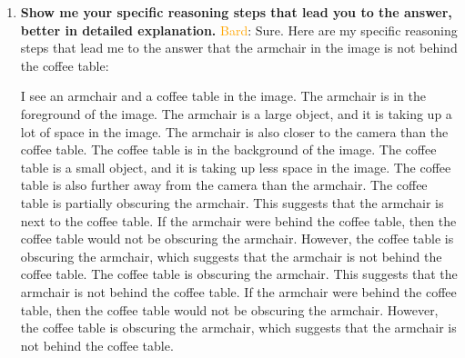 \begin{enumerate}
    The armchair is in the foreground of the image. The armchair is a large object, and it is taking up a lot of space in the image. The armchair is also closer to the camera than the coffee table.
    The coffee table is in the background of the image. The coffee table is a small object, and it is taking up less space in the image. The coffee table is also further away from the camera than the armchair.
    The coffee table is partially obscuring the armchair. This suggests that the armchair is next to the coffee table.
    If the armchair were behind the coffee table, then the coffee table would not be obscuring the armchair. However, the coffee table is obscuring the armchair, which suggests that the armchair is not behind the coffee table.
    
    Therefore, the armchair in the image is not behind the coffee table. The armchair is next to the coffee table.
    \subitem \textcolor{orange}{Visual ChatGPT}: The armchair is not behind the coffee table, it is located to the left of the coffee table.
    \subitem \textcolor{orange}{MiniGPT-4}: No, the armchair is in front of the coffee table. The armchair is positioned near the coffee table, and they are facing each other. The armchair is on the right side of the coffee table, and the coffee table is on the left side of the armchair. There is a rug on the floor in front of the armchair and coffee table. The room has a neutral color scheme, with beige walls and light wood furniture. The lighting in the room is bright and evenly distributed.
    \item \textbf{Show me your specific reasoning steps that lead you to the answer, better in detailed explanation.}
    \subitem \textcolor{orange}{Bard}: 
    Sure. Here are my specific reasoning steps that lead me to the answer that the armchair in the image is not behind the coffee table:
    
    I see an armchair and a coffee table in the image.
    The armchair is in the foreground of the image. The armchair is a large object, and it is taking up a lot of space in the image. The armchair is also closer to the camera than the coffee table.
    The coffee table is in the background of the image. The coffee table is a small object, and it is taking up less space in the image. The coffee table is also further away from the camera than the armchair.
    The coffee table is partially obscuring the armchair. This suggests that the armchair is next to the coffee table.
    If the armchair were behind the coffee table, then the coffee table would not be obscuring the armchair. However, the coffee table is obscuring the armchair, which suggests that the armchair is not behind the coffee table.
    The coffee table is obscuring the armchair. This suggests that the armchair is not behind the coffee table. If the armchair were behind the coffee table, then the coffee table would not be obscuring the armchair. However, the coffee table is obscuring the armchair, which suggests that the armchair is not behind the coffee table.
    

\end{enumerate}

